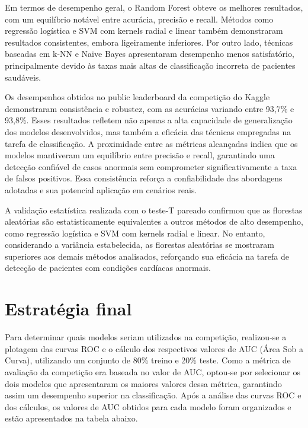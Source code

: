 \documentclass[10pt, conference, compsocconf]{IEEEtran}
\begin{document}
Em termos de desempenho geral, o Random Forest obteve os melhores resultados, com um equilíbrio notável entre acurácia, precisão e recall. Métodos como regressão logística e SVM com kernels radial e linear também demonstraram resultados consistentes, embora ligeiramente inferiores. Por outro lado, técnicas baseadas em k-NN e Naive Bayes apresentaram desempenho menos satisfatório, principalmente devido às taxas mais altas de classificação incorreta de pacientes saudáveis.


Os desempenhos obtidos no public leaderboard da competição do Kaggle demonstraram consistência e robustez, com as acurácias variando entre 93,7\% 
e 93,8\%. Esses resultados refletem não apenas a alta capacidade de generalização dos modelos desenvolvidos, mas também a eficácia das técnicas 
empregadas na tarefa de classificação. A proximidade entre as métricas alcançadas indica que os modelos mantiveram um equilíbrio entre precisão e recall, 
garantindo uma detecção confiável de casos anormais sem comprometer significativamente a taxa de falsos positivos. Essa consistência reforça a confiabilidade 
das abordagens adotadas e sua potencial aplicação em cenários reais.

A validação estatística realizada com o teste-T pareado confirmou que as florestas aleatórias são estatisticamente equivalentes a outros métodos de alto desempenho, como regressão logística e SVM com kernels radial e linear. No entanto, considerando a variância estabelecida, as florestas aleatórias se mostraram superiores aos demais métodos analisados, reforçando sua eficácia na tarefa de detecção de pacientes com condições cardíacas anormais.

\section{Estratégia final}


Para determinar quais modelos seriam utilizados na competição, realizou-se a plotagem das curvas ROC e o cálculo dos respectivos valores de AUC 
(Área Sob a Curva), utilizando um conjunto de 80\% treino e 20\% teste. Como a métrica de avaliação da competição era baseada no valor de AUC, optou-se por selecionar os dois modelos que apresentaram os 
maiores valores dessa métrica, garantindo assim um desempenho superior na classificação. Após a análise das curvas ROC e dos cálculos, os valores de AUC 
obtidos para cada modelo foram organizados e estão apresentados na tabela abaixo. 
\end{document}
